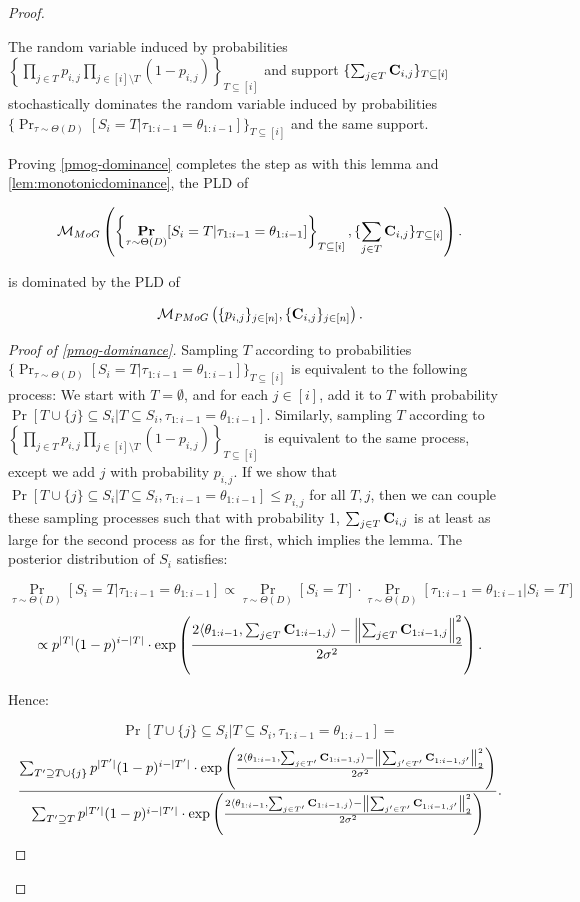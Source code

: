 \begin{proof}
\begin{lem}
The random variable induced by probabilities $\left\{\prod_{j \in T} p_{i,j} \prod_{j \in [i] \setminus T} (1 - p_{i,j})\right\}_{T \subseteq [i]}$ and support $\{\sum_{j \in T} \mathbf{C}_{i, j}\}_{T \subseteq [i]}$ stochastically dominates the random variable induced by probabilities $\{\Pr_{\tau \sim \Theta(D)}[S_i = T | \tau_{1:i-1} = \theta_{1:i-1}]\}_{T \subseteq [i]}$ and the same support.
\end{lem}

Proving \cref{pmog-dominance} completes the step as with this lemma and \cref{lem:monotonicdominance}, the PLD of 

\[\mathcal{M}_{MoG}\left(\left\{\mathop{\mathbf{Pr}}_{\tau \sim \Theta(D)}[S_i = T | \tau_{1:i-1} = \theta_{1:i-1}]\right\}_{T \subseteq [i]}, \{\sum_{j \in T} \mathbf{C}_{i, j} \}_{T \subseteq [i]}\right).\]

is dominated by the PLD of

\[\mathcal{M}_{PMoG}\left(\{p_{i,j}\}_{j \in [n]}, \{\mathbf{C}_{i,j}\}_{j \in [n]}\right).\]
\begin{proof}[Proof of \cref{pmog-dominance}]

Sampling $T$ according to probabilities $\{\Pr_{\tau \sim \Theta(D)}[S_i = T | \tau_{1:i-1} = \theta_{1:i-1}]\}_{T \subseteq [i]}$ is equivalent to the following process: We start with $T = \emptyset$, and for each $j \in [i]$, add it to $T$ with probability $\Pr[T \cup \{j\} \subseteq S_i | T \subseteq S_i, \tau_{1:i-1} = \theta_{1:i-1}]$. Similarly, sampling $T$ according to $\left\{\prod_{j \in T} p_{i,j} \prod_{j \in [i] \setminus T} (1 - p_{i,j})\right\}_{T \subseteq [i]}$ is equivalent to the same process, except we add $j$ with probability $p_{i,j}$. If we show that $\Pr[T \cup \{j\} \subseteq S_i | T \subseteq S_i, \tau_{1:i-1} = \theta_{1:i-1}] \leq p_{i,j}$ for all $T, j$, then we can couple these sampling processes such that with probability 1, $\sum_{j \in T} \mathbf{C}_{i,j}$ is at least as large for the second process as for the first, which implies the lemma. The posterior distribution of $S_i$ satisfies:

\[\Pr_{\tau \sim \Theta(D)}[S_i = T | \tau_{1:i-1} = \theta_{1:i-1}] \propto \Pr_{\tau \sim \Theta(D)}[S_i = T] \cdot \Pr_{\tau \sim \Theta(D)}[\tau_{1:i-1} = \theta_{1:i-1} | S_i = T]\]
\[ \propto p^{|T|}(1-p)^{i - |T|} \cdot \exp\left(\frac{2 \langle \theta_{1:i-1}, \sum_{j \in T}  \mathbf{C}_{1:i-1,j}\rangle - \left\|\sum_{j \in T}  \mathbf{C}_{1:i-1, j}\right\|_2^2}{2 \sigma^2}\right).\]

Hence:

\[\Pr[T \cup \{j\} \subseteq S_i | T \subseteq S_i, \tau_{1:i-1} = \theta_{1:i-1}] =\]
\[\frac{\sum_{T' \supseteq T \cup \{j\}}p^{|T'|}(1-p)^{i - |T'|} \cdot \exp\left(\frac{2 \langle \theta_{1:i-1}, \sum_{j \in T'}  \mathbf{C}_{1:i-1,j}\rangle - \left\|\sum_{j' \in T'}  \mathbf{C}_{1:i-1, j'}\right\|_2^2}{2 \sigma^2}\right)}{\sum_{T' \supseteq T}p^{|T'|}(1-p)^{i - |T'|} \cdot \exp\left(\frac{2 \langle \theta_{1:i-1}, \sum_{j \in T'}  \mathbf{C}_{1:i-1,j}\rangle - \left\|\sum_{j' \in T'}  \mathbf{C}_{1:i-1, j'}\right\|_2^2}{2 \sigma^2}\right)}.\]


\end{proof}
\end{proof}
